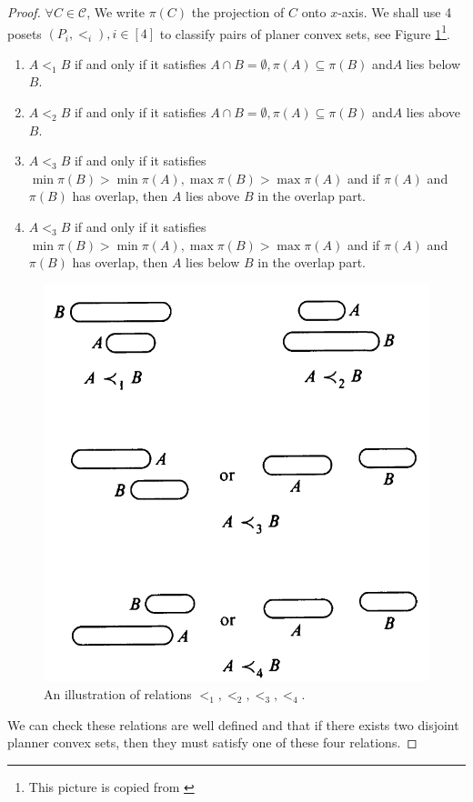 \documentclass{article}
\theoremstyle{definition}
\begin{document}
\begin{proof}
    $\forall C\in \mathcal{C}$, We write $\pi(C)$ the projection of $C$ onto $x$-axis. We shall use 4 posets $(P_i,<_i),i\in [4]$ to classify pairs of planer convex sets, see Figure \ref{fig:14-1}\footnote{This picture is copied from \cite{LarmanDavidet1994}}.
    \begin{enumerate}
        \item $A<_1B$ if and only if it satisfies $A\cap B=\emptyset, \pi(A)\subseteq\pi(B)$ and$ A$ lies below $B.$

        \item $A<_2B$ if and only if it satisfies $A\cap B=\emptyset, \pi(A)\subseteq\pi(B)$ and$ A$ lies above $B.$

        \item $A<_3B$ if and only if it satisfies $\min \pi(B)>\min \pi(A), \max \pi(B)>\max \pi(A)$ and if $\pi (A)$ and $\pi (B)$ has overlap, then $A$ lies above $B$ in the overlap part.

        \item $A<_3B$ if and only if it satisfies $\min \pi(B)>\min \pi(A), \max \pi(B)>\max \pi(A)$ and if $\pi (A)$ and $\pi (B)$ has overlap, then $A$ lies below $B$ in the overlap part.
    \end{enumerate}
    \begin{figure}[H]
        \centering
        \includegraphics[scale=0.3]{14-1.png}
        \caption{An illustration of relations $<_1,<_2,<_3,<_4$.}
        \label{fig:14-1}
    \end{figure}
    We can check these relations are well defined and that if there exists two disjoint planner convex sets, then they must satisfy one of these four relations.


\end{proof}
\end{document}
